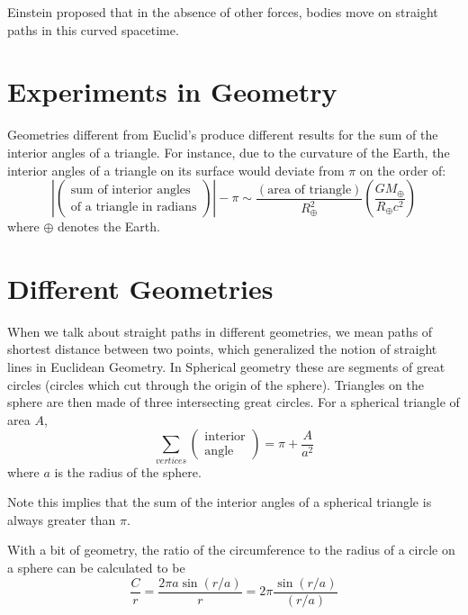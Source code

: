 Einstein proposed that in the absence of other forces, bodies move on straight paths in this curved spacetime.

\section{Experiments in Geometry}
\label{sec:ExpGeom}

Geometries different from Euclid's produce different results for the sum of the interior angles of a triangle. For instance, due to the curvature of the Earth, the interior angles of a triangle on its surface would deviate from $\pi$ on the order of: $$\left|\left(\begin{array}{c} \text{sum of interior angles} \\ \text{of a triangle in radians}\end{array}\right)\right| - \pi \sim \frac{(\text{area of triangle})}{R_{\oplus}^2}\left(\frac{GM_{\oplus}}{R_{\oplus}c^2}\right)$$
where $\oplus$ denotes the Earth. 


\section{Different Geometries}
\label{sec:DiffGeom}

When we talk about straight paths in different geometries, we mean paths of shortest distance between two points, which generalized the notion of straight lines in Euclidean Geometry. In Spherical geometry these are segments of great circles (circles which cut through the origin of the sphere). Triangles on the sphere are then made of three intersecting great circles. For a spherical triangle of area $A$, $$\sum_{vertices}\left(\begin{array}{c} \text{interior} \\ \text{angle}\end{array}\right) = \pi + \frac{A}{a^2}$$
where $a$ is the radius of the sphere.

Note this implies that the sum of the interior angles of a spherical triangle is always greater than $\pi$.

With a bit of geometry, the ratio of the circumference to the radius of a circle on a sphere can be calculated to be $$\frac{C}{r} = \frac{2\pi a\sin(r/a)}{r} = 2\pi\frac{\sin(r/a)}{(r/a)}$$

